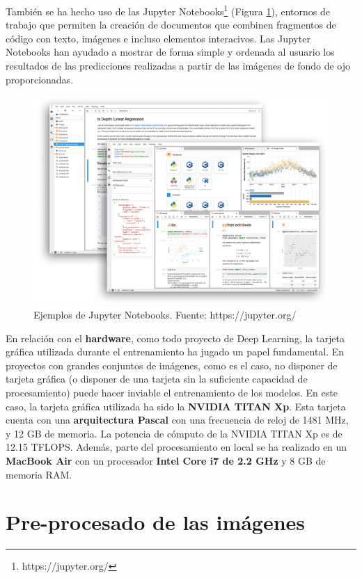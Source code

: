 \documentclass[
  12pt,
  spanish,
  a4paperpaper,
]{report}
\begin{document}
También se ha hecho uso de las Jupyter Notebooks\footnote{https://jupyter.org/}
(Figura \ref{jupyter}), entornos de trabajo que permiten la creación de
documentos que combinen fragmentos de código con texto, imágenes e
incluso elementos interacivos. Las Jupyter Notebooks han ayudado a
mostrar de forma simple y ordenada al usuario los resultados de las
predicciones realizadas a partir de las imágenes de fondo de ojo
proporcionadas.

\begin{figure}
\centering
\includegraphics[width=1\textwidth,height=\textheight]{source/figures/jupyter.png}
\caption{Ejemplos de Jupyter Notebooks. Fuente: https://jupyter.org/
\label{jupyter}}
\end{figure}

En relación con el \textbf{hardware}, como todo proyecto de Deep
Learning, la tarjeta gráfica utilizada durante el entrenamiento ha
jugado un papel fundamental. En proyectos con grandes conjuntos de
imágenes, como es el caso, no disponer de tarjeta gráfica (o disponer de
una tarjeta sin la suficiente capacidad de procesamiento) puede hacer
inviable el entrenamiento de los modelos. En este caso, la tarjeta
gráfica utilizada ha sido la \textbf{NVIDIA TITAN Xp}. Esta tarjeta
cuenta con una \textbf{arquitectura Pascal} con una frecuencia de reloj
de 1481 MHz, y 12 GB de memoria. La potencia de cómputo de la NVIDIA
TITAN Xp es de 12.15 TFLOPS. Además, parte del procesamiento en local se
ha realizado en un \textbf{MacBook Air} con un procesador \textbf{Intel
Core i7 de 2.2 GHz} y 8 GB de memoria RAM.

\hypertarget{pre-procesado-de-las-imuxe1genes}{%
\section{Pre-procesado de las
imágenes}\label{pre-procesado-de-las-imuxe1genes}}
\end{document}
